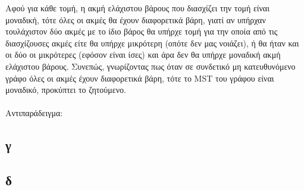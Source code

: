 \documentclass[12pt,a4paper]{article}
\begin{document}
  Αφού για κάθε τομή, η ακμή ελάχιστου βάρους που διασχίζει την τομή είναι
  μοναδική, τότε όλες οι ακμές θα έχουν διαφορετικά βάρη, γιατί αν υπήρχαν
  τουλάχιστον δύο ακμές με το ίδιο βάρος θα υπήρχε τομή για την οποία από
  τις διασχίζουσες ακμές είτε θα υπήρχε μικρότερη (οπότε δεν μας νοιάζει), ή
  θα ήταν και οι δύο οι μικρότερες (εφόσον είναι ίσες) και άρα δεν θα υπήρχε
  μοναδική ακμή ελάχιστου βάρους. Συνεπώς, γνωρίζοντας πως όταν σε συνδετικό μη
  κατευθυνόμενο γράφο όλες οι ακμές έχουν διαφορετικά βάρη, τότε το
  {\latintext MST} του γράφου είναι μοναδικό, προκύπτει το ζητούμενο.
  \\
  \\
  Αντιπαράδειγμα:
  \\
  \begin{center}
    
  \end{center}
  \subsection{γ}

  \subsection{δ}
\end{document}
